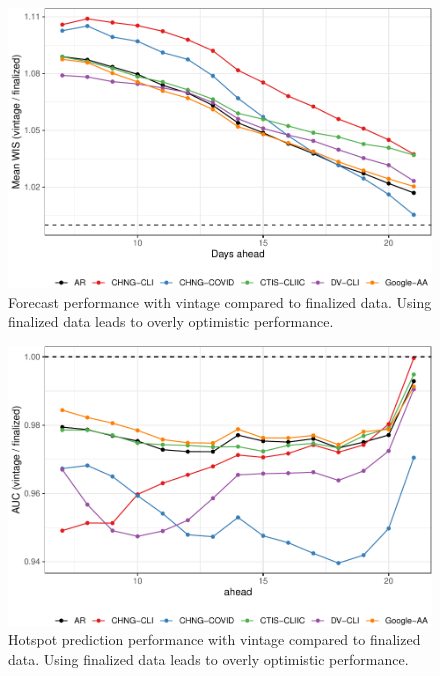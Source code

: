 \clearpage

\begin{figure}

{\centering \includegraphics[width=\textwidth]{fig/fcast-honest-v-finalized-1} 

}

\caption{Forecast performance with vintage compared to finalized data. Using finalized data leads to overly optimistic performance.}\label{fig:fcast-honest-v-finalized}
\end{figure}

\clearpage

\begin{figure}

{\centering \includegraphics[width=\textwidth]{fig/hot-honest-v-finalized-1} 

}

\caption{Hotspot prediction performance with vintage compared to finalized data. Using finalized data leads to overly optimistic performance.}\label{fig:hot-honest-v-finalized}
\end{figure}

